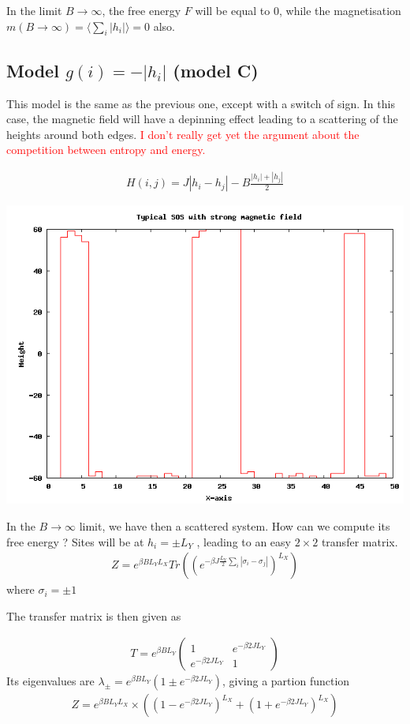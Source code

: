 In the limit $B \rightarrow \infty$, the free energy $F$ will be equal to $0$, while the magnetisation $m(B \rightarrow \infty) = \langle\sum_i |h_i|\rangle = 0$ also.

\subsection{Model $g(i) = -|h_i|$ (model C)}

This model is the same as the previous one, except with a switch of sign. In this case, the magnetic field will have a depinning effect leading to a scattering of the heights around both edges. \textcolor{red}{I don't really get yet the argument about the competition between entropy and energy.}

\begin{align}
  H(i,j) = J |h_i-h_j| - B \frac{|h_i| + |h_j|}{2}
\end{align}

\includegraphics{tm/negstagged.png}

In the $B \rightarrow \infty$ limit, we have then a scattered system. How can we compute its free energy ? Sites will be at $h_i=\pm L_Y$ , leading to an easy $2\times 2$ transfer matrix.
\begin{align}
  Z = e^{\beta B L_Y L_X} Tr( (e^{-\beta J \frac{L_Y}{2} \sum_i |\sigma_i - \sigma_j| })^{L_X} )
\end{align}
where $\sigma_i = \pm 1$

The transfer matrix is then given as

\begin{align}
T= e^{\beta B L_Y}
  \begin{pmatrix}
    1 & e^{-\beta 2 J L_Y} \\
    e^{-\beta 2 J L_Y} & 1
  \end{pmatrix}
\end{align}
Its eigenvalues are $\lambda_\pm = e^{\beta B L_Y}( 1 \pm e^{-\beta 2 J L_Y})$, giving a partion function 
\begin{align}
  Z = e^{\beta B L_Y L_X} \times ((1 - e^{-\beta 2 J L_Y})^{L_X} + (1 + e^{-\beta 2 J L_Y})^{L_X} )
\end{align}

